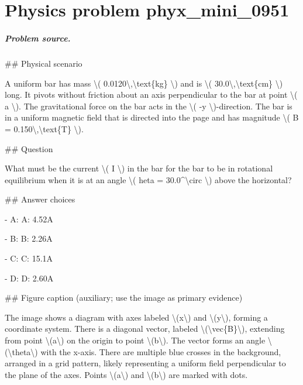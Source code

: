 
\chapter{Physics problem phyx\_mini\_0951}
\label{ch:PhyXMiniProblems_problem_phyx_mini_0951}

\paragraph{Problem source.}
\#\# Physical scenario

A uniform bar has mass \textbackslash{}( 0.0120\textbackslash{},\textbackslash{}text\{kg\} \textbackslash{}) and is \textbackslash{}( 30.0\textbackslash{},\textbackslash{}text\{cm\} \textbackslash{}) long. It pivots without friction about an axis perpendicular to the bar at point \textbackslash{}( a \textbackslash{}). The gravitational force on the bar acts in the \textbackslash{}( -y \textbackslash{})-direction. The bar is in a uniform magnetic field that is directed into the page and has magnitude \textbackslash{}( B = 0.150\textbackslash{},\textbackslash{}text\{T\} \textbackslash{}).

\#\# Question

What must be the current \textbackslash{}( I \textbackslash{}) in the bar for the bar to be in rotational equilibrium when it is at an angle \textbackslash{}( 	heta = 30.0\textasciicircum{}\textbackslash{}circ \textbackslash{}) above the horizontal?

\#\# Answer choices

- A: A: 4.52A

- B: B: 2.26A

- C: C: 15.1A

- D: D: 2.60A

\#\# Figure caption (auxiliary; use the image as primary evidence)

The image shows a diagram with axes labeled \textbackslash{}(x\textbackslash{}) and \textbackslash{}(y\textbackslash{}), forming a coordinate system. There is a diagonal vector, labeled \textbackslash{}(\textbackslash{}vec\{B\}\textbackslash{}), extending from point \textbackslash{}(a\textbackslash{}) on the origin to point \textbackslash{}(b\textbackslash{}). The vector forms an angle \textbackslash{}(\textbackslash{}theta\textbackslash{}) with the x-axis. There are multiple blue crosses in the background, arranged in a grid pattern, likely representing a uniform field perpendicular to the plane of the axes. Points \textbackslash{}(a\textbackslash{}) and \textbackslash{}(b\textbackslash{}) are marked with dots.

